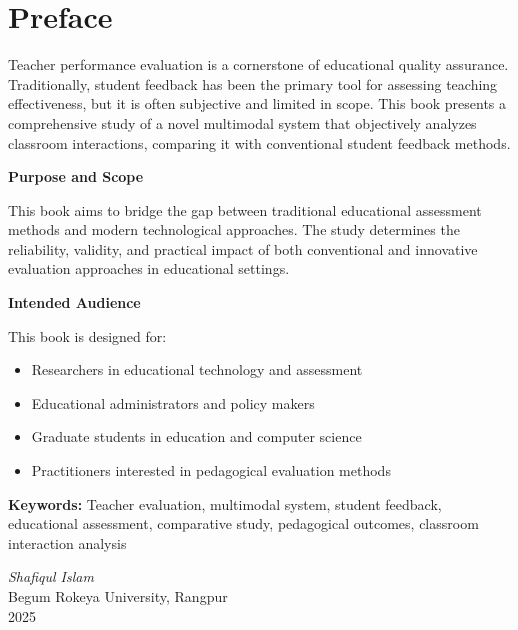 \documentclass[11pt,twoside,openright]{book}
\begin{document}
\newpage

\chapter*{Preface}

Teacher performance evaluation is a cornerstone of educational quality assurance. Traditionally, student feedback has been the primary tool for assessing teaching effectiveness, but it is often subjective and limited in scope. This book presents a comprehensive study of a novel multimodal system that objectively analyzes classroom interactions, comparing it with conventional student feedback methods.

\vspace{0.5cm}

\textbf{Purpose and Scope}

This book aims to bridge the gap between traditional educational assessment methods and modern technological approaches. The study determines the reliability, validity, and practical impact of both conventional and innovative evaluation approaches in educational settings.

\vspace{0.5cm}

\textbf{Intended Audience}

This book is designed for:
\begin{itemize}[leftmargin=1em]
    \item Researchers in educational technology and assessment
    \item Educational administrators and policy makers
    \item Graduate students in education and computer science
    \item Practitioners interested in pedagogical evaluation methods
\end{itemize}

\vspace{0.5cm}

\begin{tcolorbox}[pearsonbox, title=Key Topics Covered]
\textbf{Keywords:} Teacher evaluation, multimodal system, student feedback, educational assessment, comparative study, pedagogical outcomes, classroom interaction analysis
\end{tcolorbox}

\vspace{1cm}

\textit{Shafiqul Islam} \\
Begum Rokeya University, Rangpur \\
2025
\end{document}
